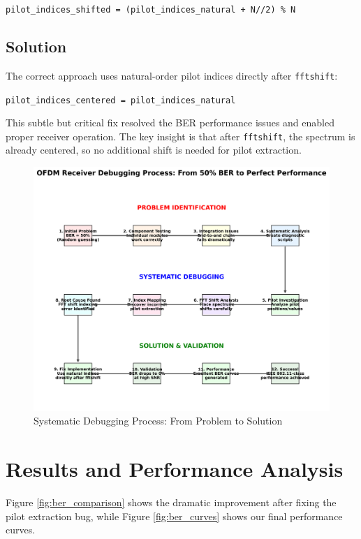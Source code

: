 \documentclass[11pt,a4paper]{article}
\begin{document}
\texttt{pilot\_indices\_shifted = (pilot\_indices\_natural + N//2) \% N}

\subsection{Solution}
The correct approach uses natural-order pilot indices directly after \texttt{fftshift}:

\texttt{pilot\_indices\_centered = pilot\_indices\_natural}

This subtle but critical fix resolved the BER performance issues and enabled proper receiver operation. The key insight is that after \texttt{fftshift}, the spectrum is already centered, so no additional shift is needed for pilot extraction.

\begin{figure}[H]
    \centering
    \includegraphics[width=\textwidth]{debugging_process_diagram.png}
    \caption{Systematic Debugging Process: From Problem to Solution}
    \label{fig:debugging_process}
\end{figure}

\section{Results and Performance Analysis}

Figure \ref{fig:ber_comparison} shows the dramatic improvement after fixing the pilot extraction bug, while Figure \ref{fig:ber_curves} shows our final performance curves.
\end{document}
